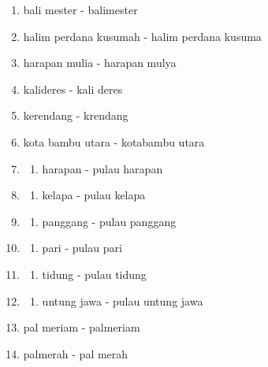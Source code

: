 \documentclass[openany]{book}
\providecommand{\tightlist}{%
  \setlength{\itemsep}{0pt}\setlength{\parskip}{0pt}}
\begin{document}
\begin{enumerate}
\def\labelenumi{\arabic{enumi}.}
\item
  bali mester - balimester
\item
  halim perdana kusumah - halim perdana kusuma
\item
  harapan mulia - harapan mulya
\item
  kalideres - kali deres
\item
  kerendang - krendang
\item
  kota bambu utara - kotabambu utara
\item
  \begin{enumerate}
  \def\labelenumii{\alph{enumii}.}
  \setcounter{enumii}{15}
  \tightlist
  \item
    harapan - pulau harapan
  \end{enumerate}
\item
  \begin{enumerate}
  \def\labelenumii{\alph{enumii}.}
  \setcounter{enumii}{15}
  \tightlist
  \item
    kelapa - pulau kelapa
  \end{enumerate}
\item
  \begin{enumerate}
  \def\labelenumii{\alph{enumii}.}
  \setcounter{enumii}{15}
  \tightlist
  \item
    panggang - pulau panggang
  \end{enumerate}
\item
  \begin{enumerate}
  \def\labelenumii{\alph{enumii}.}
  \setcounter{enumii}{15}
  \tightlist
  \item
    pari - pulau pari
  \end{enumerate}
\item
  \begin{enumerate}
  \def\labelenumii{\alph{enumii}.}
  \setcounter{enumii}{15}
  \tightlist
  \item
    tidung - pulau tidung
  \end{enumerate}
\item
  \begin{enumerate}
  \def\labelenumii{\alph{enumii}.}
  \setcounter{enumii}{15}
  \tightlist
  \item
    untung jawa - pulau untung jawa
  \end{enumerate}
\item
  pal meriam - palmeriam
\item
  palmerah - pal merah
\end{enumerate}
\end{document}
